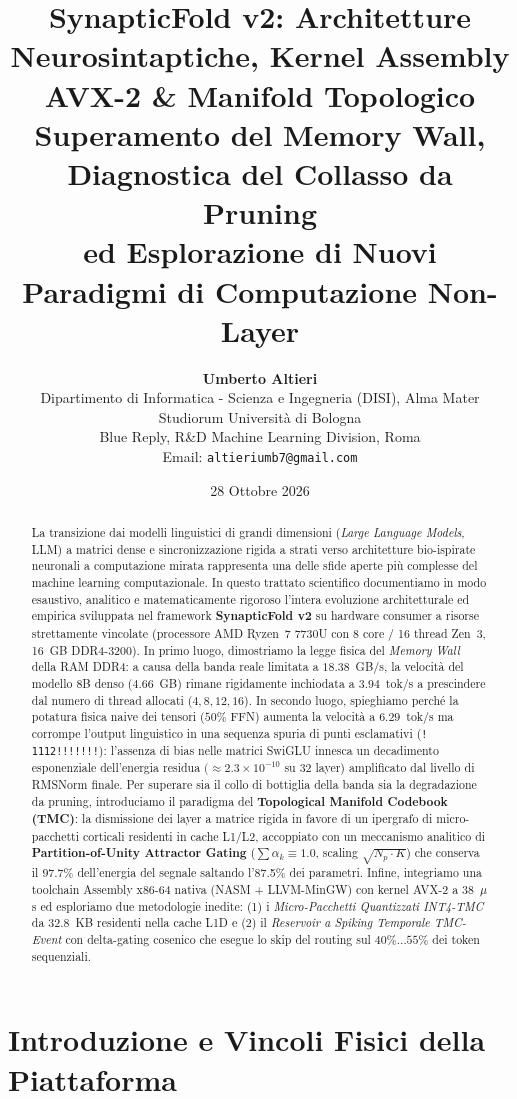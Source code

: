 \documentclass[10pt,a4paper]{article}
\title{\textbf{\LARGE SynapticFold v2: Architetture Neurosintaptiche, Kernel Assembly AVX-2 \& Manifold Topologico}\\[0.3em]
\Large Superamento del Memory Wall, Diagnostica del Collasso da Pruning\\
ed Esplorazione di Nuovi Paradigmi di Computazione Non-Layer}
\author{\textbf{Umberto Altieri}\\[0.2em]
\small Dipartimento di Informatica - Scienza e Ingegneria (DISI), Alma Mater Studiorum Università di Bologna\\
\small Blue Reply, R\&D Machine Learning Division, Roma\\
\small Email: \texttt{altieriumb7@gmail.com}}
\date{28 Ottobre 2026}
\theoremstyle{definition}
\begin{document}
\maketitle

\begin{abstract}
La transizione dai modelli linguistici di grandi dimensioni (\textit{Large Language Models}, LLM) a matrici dense e sincronizzazione rigida a strati verso architetture bio-ispirate neuronali a computazione mirata rappresenta una delle sfide aperte più complesse del machine learning computazionale. In questo trattato scientifico documentiamo in modo esaustivo, analitico e matematicamente rigoroso l'intera evoluzione architetturale ed empirica sviluppata nel framework \textbf{SynapticFold v2} su hardware consumer a risorse strettamente vincolate (processore AMD Ryzen~7 7730U con 8 core / 16 thread Zen~3, 16~GB DDR4-3200). 
In primo luogo, dimostriamo la legge fisica del \textit{Memory Wall} della RAM DDR4: a causa della banda reale limitata a $18.38$~GB/s, la velocità del modello 8B denso ($4.66$~GB) rimane rigidamente inchiodata a $3.94$~tok/s a prescindere dal numero di thread allocati ($4, 8, 12, 16$).
In secondo luogo, spieghiamo perché la potatura fisica naive dei tensori ($50\%$ FFN) aumenta la velocità a $6.29$~tok/s ma corrompe l'output linguistico in una sequenza spuria di punti esclamativi (\texttt{! 1112!!!!!!!}): l'assenza di bias nelle matrici SwiGLU innesca un decadimento esponenziale dell'energia residua $(\approx 2.3 \times 10^{-10}$ su 32 layer) amplificato dal livello di RMSNorm finale.
Per superare sia il collo di bottiglia della banda sia la degradazione da pruning, introduciamo il paradigma del \textbf{Topological Manifold Codebook (TMC)}: la dismissione dei layer a matrice rigida in favore di un ipergrafo di micro-pacchetti corticali residenti in cache L1/L2, accoppiato con un meccanismo analitico di \textbf{Partition-of-Unity Attractor Gating} ($\sum \alpha_k \equiv 1.0$, scaling $\sqrt{N_p \cdot K}$) che conserva il $97.7\%$ dell'energia del segnale saltando l'87.5\% dei parametri.
Infine, integriamo una toolchain Assembly x86-64 nativa (NASM + LLVM-MinGW) con kernel AVX-2 a 38~$\mu$s ed esploriamo due metodologie inedite: (1) i \textit{Micro-Pacchetti Quantizzati INT4-TMC} da $32.8$~KB residenti nella cache L1D e (2) il \textit{Reservoir a Spiking Temporale TMC-Event} con delta-gating cosenico che esegue lo skip del routing sul $40\%\dots 55\%$ dei token sequenziali.
\end{abstract}

\section{Introduzione e Vincoli Fisici della Piattaforma}
\end{document}
